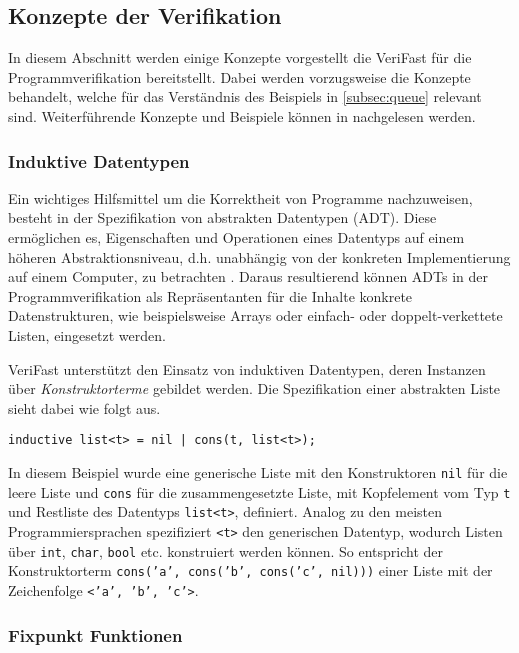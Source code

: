 \subsection{Konzepte der Verifikation}
\label{subsec:vflang}

In diesem Abschnitt werden einige Konzepte vorgestellt die VeriFast für die Programmverifikation bereitstellt. Dabei werden vorzugsweise die Konzepte behandelt, welche für das Verständnis des Beispiels in \cref{subsec:queue} relevant sind. Weiterführende Konzepte und Beispiele können in \cite{Jacobs2017} nachgelesen werden.

\subsubsection{Induktive Datentypen}
\label{subsubsec:adt}

Ein wichtiges Hilfsmittel um die Korrektheit von Programme nachzuweisen, besteht in der Spezifikation von abstrakten Datentypen (ADT). Diese ermöglichen es, Eigenschaften und Operationen eines Datentyps auf einem höheren Abstraktionsniveau, d.h. unabhängig von der konkreten Implementierung auf einem Computer, zu betrachten \cite[S. 265]{Saake2014}. Daraus resultierend können ADTs in der Programmverifikation als Repräsentanten für die Inhalte konkrete Datenstrukturen, wie beispielsweise Arrays oder einfach- oder doppelt-verkettete Listen, eingesetzt werden.

VeriFast unterstützt den Einsatz von induktiven Datentypen, deren Instanzen über \emph{Konstruktorterme} gebildet werden. Die Spezifikation einer abstrakten Liste sieht dabei wie folgt aus.

\begin{lstlisting}
inductive list<t> = nil | cons(t, list<t>);
\end{lstlisting}

\noindent
In diesem Beispiel wurde eine generische Liste mit den Konstruktoren \texttt{nil} für die leere Liste und \texttt{cons} für die zusammengesetzte Liste, mit Kopfelement vom Typ \texttt{t} und Restliste des Datentyps \texttt{list<t>}, definiert. Analog zu den meisten Programmiersprachen spezifiziert \texttt{<t>} den generischen Datentyp, wodurch Listen über \texttt{int}, \texttt{char}, \texttt{bool} etc. konstruiert werden können. So entspricht der Konstruktorterm \texttt{cons('a', cons('b', cons('c', nil)))} einer Liste mit der Zeichenfolge \texttt{<'a', 'b', 'c'>}.

\subsubsection{Fixpunkt Funktionen}

